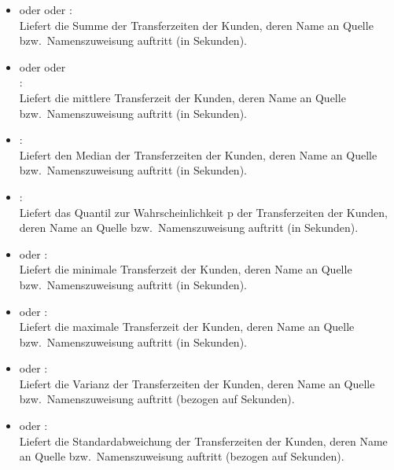 \begin{itemize}

\item
{} oder  oder :\\
Liefert die Summe der Transferzeiten der Kunden, deren Name an Quelle bzw.\ Namenszuweisung  auftritt (in Sekunden).

\item
{} oder  oder\\
:\\
Liefert die mittlere Transferzeit der Kunden, deren Name an Quelle bzw.\ Namenszuweisung  auftritt (in Sekunden).

\item
{}:\\
Liefert den Median der Transferzeiten der Kunden, deren Name an Quelle bzw.\ Namenszuweisung  auftritt (in Sekunden).

\item
{}:\\
Liefert das Quantil zur Wahrscheinlichkeit p der Transferzeiten der Kunden, deren Name an Quelle bzw.\ Namenszuweisung  auftritt (in Sekunden).

\item
{} oder :\\
Liefert die minimale Transferzeit der Kunden, deren Name an Quelle bzw.\ Namenszuweisung  auftritt (in Sekunden).

\item
{} oder :\\
Liefert die maximale Transferzeit der Kunden, deren Name an Quelle bzw.\ Namenszuweisung  auftritt (in Sekunden).

\item
{} oder :\\
Liefert die Varianz der Transferzeiten der Kunden, deren Name an Quelle bzw.\ Namenszuweisung  auftritt (bezogen auf Sekunden).

\item
{} oder :\\
Liefert die Standardabweichung der Transferzeiten der Kunden, deren Name an Quelle bzw.\ Namenszuweisung  auftritt (bezogen auf Sekunden).


\end{itemize}
